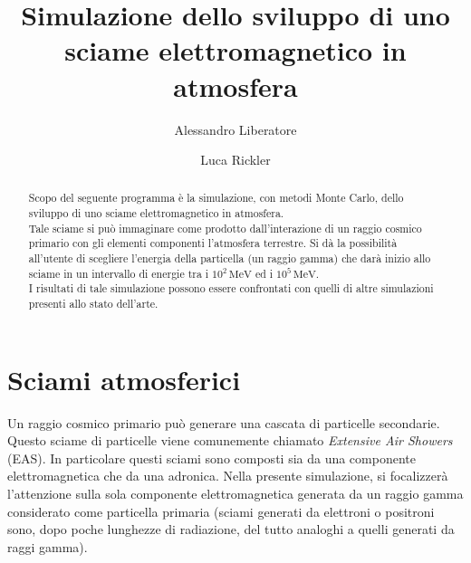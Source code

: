 \documentclass[10pt,a4paper,usenatbib]{article}
\newcommand*{\unit}[1]{\ensuremath{\mathrm{\,#1}}}                              %
\begin{document}
\author{Alessandro Liberatore \and Luca Rickler}
\title{Simulazione dello sviluppo di uno sciame elettromagnetico in atmosfera}
\maketitle


\pagebreak
\tableofcontents
\pagebreak



\pagebreak

\begin{abstract}
Scopo del seguente programma è la simulazione, con metodi Monte Carlo, dello sviluppo di uno sciame elettromagnetico in atmosfera. 
\\Tale sciame si può immaginare come prodotto dall'interazione di un raggio cosmico primario con gli elementi componenti l'atmosfera terrestre. Si dà la possibilità all'utente di scegliere l'energia della particella (un raggio gamma) che darà inizio allo sciame in un intervallo di energie tra i $10^2\unit{MeV}$ ed i $10^5\unit{MeV}$. 
\\I risultati di tale simulazione possono essere confrontati con quelli di altre simulazioni presenti allo stato dell'arte. 
\end{abstract}



\section{Sciami atmosferici}
Un raggio cosmico primario può generare una cascata di particelle secondarie. Questo sciame di particelle viene comunemente chiamato \textit{Extensive Air Showers} (EAS). In particolare questi sciami sono composti sia da una componente elettromagnetica che da una adronica. Nella presente simulazione, si focalizzerà l'attenzione sulla sola componente elettromagnetica generata da un raggio gamma considerato come particella primaria (sciami generati da elettroni o positroni sono, dopo poche lunghezze di radiazione, del tutto analoghi a quelli generati da raggi gamma). 
\end{document}
